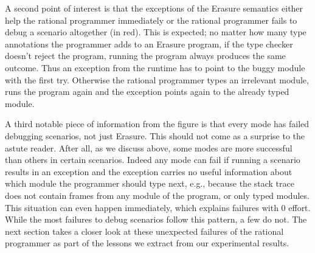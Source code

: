 A second point of interest is that the exceptions of
the Erasure semantics either help the rational programmer immediately or 
the rational programmer fails to debug a scenario altogether (in red).
This is expected; no matter how many type annotations the programmer
adds to an Erasure program, if the type checker doesn't reject the
program, running the program always produces the same outcome. Thus an
exception from the runtime has to point to the buggy module with
the first try. Otherwise the rational programmer types an irrelevant
module, runs the program again and the exception points again to the
already typed module. 

A third notable piece of information from
the figure is that every mode has failed debugging scenarios, not just
Erasure. This should
not come as a surprise to the astute
reader. After all, as we
discuss above, some modes are more successful than others in certain
scenarios. Indeed any mode can fail if running a scenario results in an
exception and the exception carries no useful information about which
module the programmer should type next, e.g., because the stack trace 
does not contain frames from any module of the program, or only typed modules. This situation
can even happen immediately, which explains failures with 0 effort. 
While the most
failures to debug scenarios follow this pattern, a few do not. The next section takes a
closer look at these unexpected failures of the rational programmer as part of the lessons we
extract from our experimental results.
